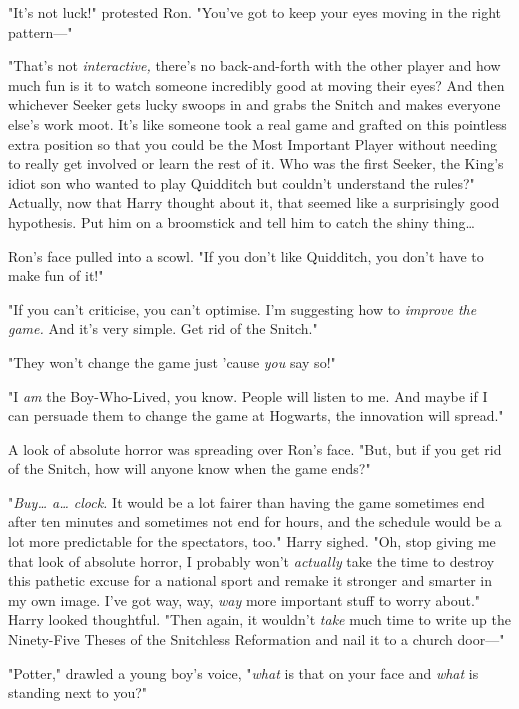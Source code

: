"It's not luck!" protested Ron. "You've got to keep your eyes moving in the 
right pattern---"

"That's not \emph{interactive,} there's no back-and-forth with the other player 
and how much fun is it to watch someone incredibly good at moving their eyes? 
And then whichever Seeker gets lucky swoops in and grabs the Snitch and makes 
everyone else's work moot. It's like someone took a real game and grafted on 
this pointless extra position so that you could be the Most Important Player 
without needing to really get involved or learn the rest of it. Who was the 
first Seeker, the King's idiot son who wanted to play Quidditch but couldn't 
understand the rules?" Actually, now that Harry thought about it, that seemed 
like a surprisingly good hypothesis. Put him on a broomstick and tell him to 
catch the shiny thing{\ldots}

Ron's face pulled into a scowl. "If you don't like Quidditch, you don't have to 
make fun of it!"

"If you can't criticise, you can't optimise. I'm suggesting how to 
\emph{improve the game.} And it's very simple. Get rid of the Snitch."

"They won't change the game just 'cause \emph{you} say so!"

"I \emph{am} the Boy-Who-Lived, you know. People will listen to me. And maybe 
if I can persuade them to change the game at Hogwarts, the innovation will 
spread."

A look of absolute horror was spreading over Ron's face. "But, but if you get 
rid of the Snitch, how will anyone know when the game ends?"

"\emph{Buy{\ldots} a{\ldots} clock.} It would be a lot fairer than having the 
game sometimes end after ten minutes and sometimes not end for hours, and the 
schedule would be a lot more predictable for the spectators, too." Harry 
sighed. "Oh, stop giving me that look of absolute horror, I probably won't 
\emph{actually} take the time to destroy this pathetic excuse for a national 
sport and remake it stronger and smarter in my own image. I've got way, way, 
\emph{way} more important stuff to worry about." Harry looked thoughtful. "Then 
again, it wouldn't \emph{take} much time to write up the Ninety-Five Theses of 
the Snitchless Reformation and nail it to a church door---"

"Potter," drawled a young boy's voice, "\emph{what} is that on your face and 
\emph{what} is standing next to you?"

